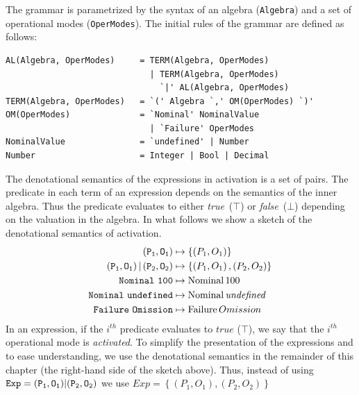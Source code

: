 The grammar is parametrized by the syntax of an algebra (\verb|Algebra|) and a set of operational modes (\verb|OperModes|).
The initial rules of the grammar are defined as follows:
\begin{verbatim}
AL(Algebra, OperModes)     = TERM(Algebra, OperModes) 
                             | TERM(Algebra, OperModes) 
                               `|' AL(Algebra, OperModes)
TERM(Algebra, OperModes)   = `(' Algebra `,' OM(OperModes) `)'
OM(OperModes)              = `Nominal' NominalValue 
                             | `Failure' OperModes
NominalValue               = `undefined' | Number
Number                     = Integer | Bool | Decimal
\end{verbatim}
%
The denotational semantics of the expressions in \ac{activation} is a set of pairs.
The predicate in each term of an expression depends on the semantics of the inner algebra.
Thus the predicate evaluates to either \emph{true}~($\top$) or \emph{false}~($\bot$) depending on the valuation in the algebra.
In what follows we show a sketch of the denotational semantics of \ac{activation}.
%
\begin{align*}
  \mathtt{\left(P_1, O_1\right)} &\mapsto \{\left(P_1, O_1\right)\}\\
  \mathtt{\left(P_1, O_1\right) | \left(P_2, O_2\right)} &\mapsto
    \{\left(P_1, O_1\right), \left(P_2, O_2\right)\}\\
  \mathtt{Nominal~100} &\mapsto \mathop{\mathrm{Nominal}} 100\\
  \mathtt{Nominal~undefined} &\mapsto \mathop{\mathrm{Nominal}} \mathit{undefined}\\
  \mathtt{Failure~Omission} &\mapsto \mathop{\mathrm{Failure}} Omission
\end{align*}
%
In an expression, if the $i^{th}$ predicate evaluates to $true$ ($\top$), we say that the $i^{th}$ operational mode is \emph{activated}.
To simplify the presentation of the expressions and to ease understanding, we use the denotational semantics in the remainder of this chapter (the right-hand side of the sketch above).
Thus, instead of using $\mathtt{Exp} = \mathtt{\left(P_1,O_1\right)} | \mathtt{\left(P_2,O_2\right)}$ we use $Exp = \left\{ \left(P_1,O_1\right), \left(P_2,O_2\right)  \right\}$

